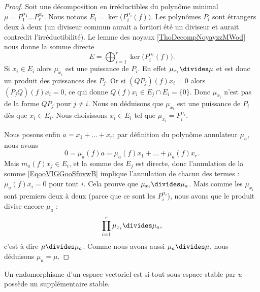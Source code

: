 \begin{proof}
    Soit une décomposition en irréductibles du polynôme minimal \( \mu=P_1^{\alpha_1}\ldots P_r^{\alpha_r}\). Nous notons \( E_i=\ker\big( P_i^{\alpha_i}(f) \big)\). Les polynômes \( P_i\) sont étrangers deux à deux (un diviseur commun aurait a fortiori été un diviseur et aurait contredit l'irréductibilité). Le lemme des noyaux \ref{ThoDecompNoyayzzMWod} nous donne la somme directe
    \begin{equation}
        E=\bigoplus_{i=1}^r\ker\big( P_i^{\alpha_i}(f) \big).
    \end{equation}
    Si \( x_i\in E_i\) alors \( \mu_{x_i}\) est une puissance de \( P_i\). En effet \( \mu_{x_i}\divides \mu\) et est donc un produit des puissances des \( P_j\). Or si \( (QP_j)(f)x_i=0\) alors \( (P_jQ)(f)x_i=0\), ce qui donne \( Q(f)x_i\in E_j\cap E_i=\{ 0 \}\). Donc \( \mu_{x_i}\) n'est pas de la forme \( QP_j\) pour \( j\neq i\). Nous en déduisons que \( \mu_{x_i}\) est une puissance de \( P_i\) dès que \( x_i\in E_i\). Nous choisissons \( x_i\in E_i\) tel que \( \mu_{x_i}=P_i^{\alpha_i}\).

    Nous posons enfin \( a=x_1+\ldots +x_r\); par définition du polynôme annulateur \( \mu_a\), nous avons
    \begin{equation}        \label{EqooVIGGooSfuvwB}
        0=\mu_a(f)a=\mu_a(f)x_1+\ldots +\mu_a(f)x_r.
    \end{equation}
    Mais \( m_a(f)x_j\in E_i\), et la somme des \( E_j\) est directe, donc l'annulation de la somme \eqref{EqooVIGGooSfuvwB} implique l'annulation de chacun des termes : \( \mu_a(f)x_i=0\) pour tout \( i\). Cela prouve que \( \mu_{x_i}\divides \mu_a\). Mais comme les \( \mu_{x_i}\) sont premiers deux à deux (parce que ce sont les \( P_i^{\alpha_i}\)), nous avons que le produit divise encore \( \mu_a\) :
    \begin{equation}
        \prod_{i=1}^r\mu_{x_i}\divides \mu_a,
    \end{equation}
    c'est à dire \( \mu\divides \mu_a\). Comme nous avons aussi \( \mu_a\divides \mu\), nous déduisons \( \mu_a=\mu\).
\end{proof}

\begin{definition}  \label{DEFooBOHVooSOopJN}
    Un endomorphisme d'un espace vectoriel est  si tout sous-espace stable par \( u\) possède un supplémentaire stable.
\end{definition}

